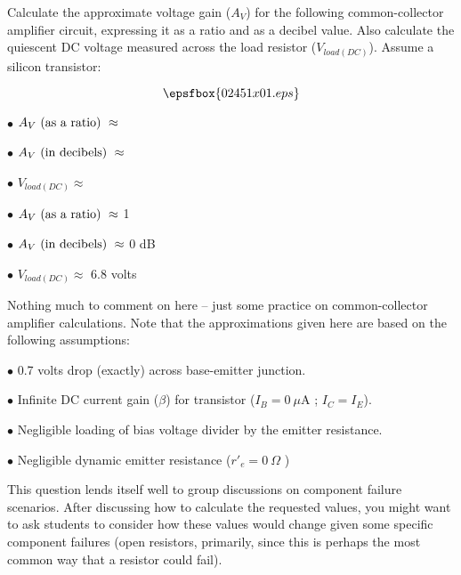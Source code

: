 

Calculate the approximate voltage gain ($A_V$) for the following common-collector amplifier circuit, expressing it as a ratio and as a decibel value.  Also calculate the quiescent DC voltage measured across the load resistor ($V_{load(DC)}$).  Assume a silicon transistor:

$$\epsfbox{02451x01.eps}$$

\medskip
\goodbreak
\item{$\bullet$} $A_V \hbox{ (as a ratio) } \approx$ 
\item{$\bullet$} $A_V \hbox{ (in decibels) } \approx$ 
\item{$\bullet$} $V_{load(DC)} \approx$ 
\medskip







\medskip
\goodbreak
\item{$\bullet$} $A_V \hbox{ (as a ratio) } \approx$ 1
\item{$\bullet$} $A_V \hbox{ (in decibels) } \approx$ 0 dB
\item{$\bullet$} $V_{load(DC)} \approx$ 6.8 volts
\medskip







Nothing much to comment on here -- just some practice on common-collector amplifier calculations.  Note that the approximations given here are based on the following assumptions:

\medskip
\goodbreak
\item{$\bullet$} 0.7 volts drop (exactly) across base-emitter junction.
\item{$\bullet$} Infinite DC current gain ($\beta$) for transistor ($I_B = 0 \> \mu$A ; $I_C = I_E$).
\item{$\bullet$} Negligible loading of bias voltage divider by the emitter resistance.
\item{$\bullet$} Negligible dynamic emitter resistance ($r'_e = 0 \> \Omega$ )
\medskip

This question lends itself well to group discussions on component failure scenarios.  After discussing how to calculate the requested values, you might want to ask students to consider how these values would change given some specific component failures (open resistors, primarily, since this is perhaps the most common way that a resistor could fail).




